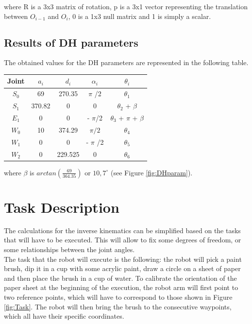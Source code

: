 \noindent where R is a 3x3 matrix of rotation, p is a 3x1 vector representing the translation between $O_{i-1}$ and $O_i$, 0 is a 1x3 null matrix and 1 is simply a scalar.

\subsection{Results of DH parameters}

The obtained values for the DH parameters are represented in the following table.\\

\begin{center}
	\begin{tabular}{c|c c c c }

		Joint & $a_i$ & $d_i$ & $\alpha_i$  & $\theta_i$ \\
        \hline
        $S_0$ & 69 & 270.35 & $\pi$ /2 & $\theta_1$ \\
        $S_1$ & 370.82 & 0 & 0 & $\theta_2$ + $\beta$\\
        $E_1$ & 0 & 0 & - $\pi$/2 & $\theta_3$ + $\pi$ + $\beta$\\
        $W_0$ & 10 & 374.29 & $\pi/2$ & $\theta_4$\\
        $W_1$ & 0 & 0 & - $\pi$ /2 & $\theta_5$ \\
        $W_2$ & 0 & 229.525 & 0 & $\theta_6$
	\end{tabular}
\end{center}

\noindent where $\beta$ is $arctan(\frac{69}{364.35})$ or $10,7^\circ$ (see Figure \ref{fig:DHparam}).


\section{Task Description}
The calculations for the inverse kinematics can be simplified based on the tasks that will have to be executed. This will allow to fix some degrees of freedom, or some relationships between the joint angles.\\
\noindent The task that the robot will execute is the following: the robot will pick a paint brush, dip it in a cup with some acrylic paint, draw a circle on a sheet of paper and then place the brush in a cup of water. To calibrate the orientation of the paper sheet at the beginning of the execution, the robot arm will first point to two reference points, which will have to correspond to those shown in Figure \ref{fig:Task}. The robot will then bring the brush to the consecutive waypoints, which all have their specific coordinates.


